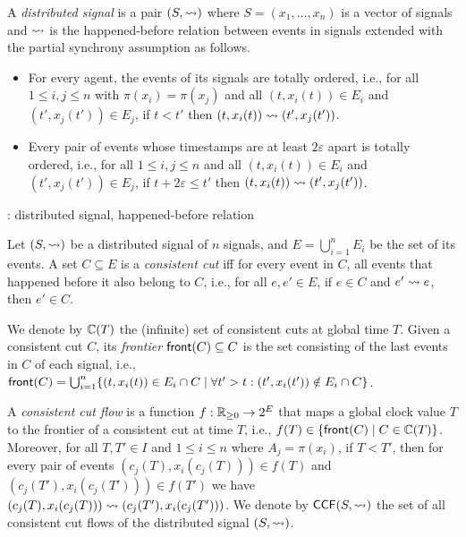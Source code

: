 \begin{definition} \label{defn:hb}
	A \emph{distributed signal} is a pair $(S, {\rightsquigarrow})$ where $S = (x_1, \ldots, x_n)$ is a vector of signals and ${\rightsquigarrow}$ is the happened-before relation between events in signals extended with the partial synchrony assumption as follows.
	\begin{itemize}
		\item For every agent, the events of its signals are totally ordered, i.e., for all $1 \leq i,j \leq n$ with $\pi(x_i) = \pi(x_j)$ and all $(t, x_i(t)) \in E_i$ and $(t', x_j(t')) \in E_j$, if $t < t'$ then $(t, x_i(t)) \rightsquigarrow (t', x_j(t'))$.
		\item Every pair of events whose timestamps are at least $2 \varepsilon$ apart is totally ordered, i.e., for all $1 \leq i,j \leq n$ and all $(t, x_i(t)) \in E_i$ and $(t', x_j(t')) \in E_j$, if $t + 2\varepsilon \leq t'$ then $(t, x_i(t)) \rightsquigarrow (t', x_j(t'))$. 
	\end{itemize}
\end{definition}

\begin{example}
	\TODO: distributed signal, happened-before relation
\end{example}

\begin{definition}
	Let $(S, {\rightsquigarrow})$ be a distributed signal of $n$ signals, and $E = \bigcup_{i = 1}^{n} E_i$ be the set of its events.
	A set $C \subseteq E$ is a \emph{consistent cut} iff for every event in $C$, all events that happened before  it also belong to $C$, i.e., for all $e, e' \in E$, if $e \in C$ and $e' \rightsquigarrow e$, then $e' \in C$.
\end{definition}

We denote by $\mathbb{C}(T)$ the (infinite) set of consistent cuts at global time $T$.
Given a consistent cut $C$, its \emph{frontier} $\mathsf{front}(C) \subseteq C$ is the set consisting of the last events in $C$ of each signal, i.e., $\fr(C) = \bigcup_{i = 1}^{n} \{ (t, x_i(t)) \in E_i \cap C \st \forall t' > t : (t', x_i(t')) \notin E_i \cap C \}$.

A \emph{consistent cut flow} is a function $f : \mathbb{R}_{\geq 0} \to 2^E$ that maps a global clock value $T$ to the frontier of a consistent cut at time $T$, i.e., $f(T) \in \{\fr(C) \st C \in \CC(T)\}$.
Moreover, for all $T,T' \in I$ and $1 \leq i \leq n$ where $A_j = \pi(x_i)$, if $T < T'$, then for every pair of events $(c_j(T), x_i(c_j(T))) \in f(T)$ and $(c_j(T'), x_i(c_j(T'))) \in f(T')$ we have $(c_j(T), x_i(c_j(T))) \rightsquigarrow (c_j(T'), x_i(c_j(T')))$.
We denote by $\mathsf{CCF}(S,{\rightsquigarrow})$ the set of all consistent cut flows of the distributed signal $(S,{\rightsquigarrow})$.

